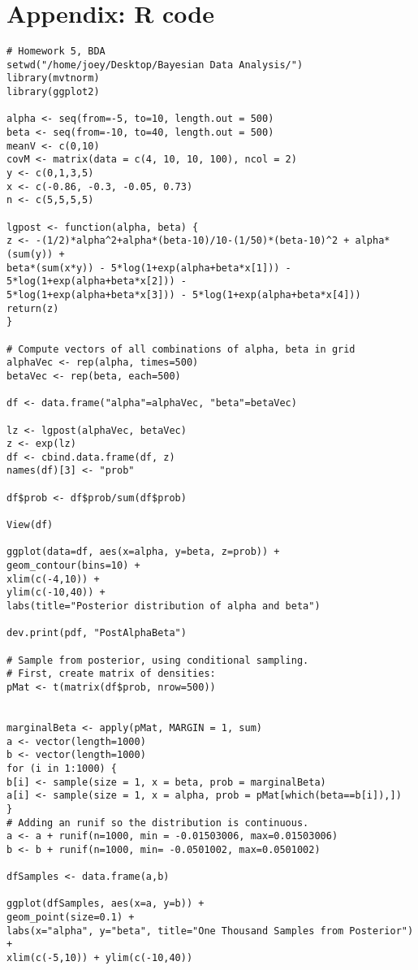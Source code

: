 \documentclass[12pt]{article}
\begin{document}
\section{Appendix: R code}
\begin{Verbatim}
# Homework 5, BDA
setwd("/home/joey/Desktop/Bayesian Data Analysis/")
library(mvtnorm)
library(ggplot2)

alpha <- seq(from=-5, to=10, length.out = 500)
beta <- seq(from=-10, to=40, length.out = 500)
meanV <- c(0,10)
covM <- matrix(data = c(4, 10, 10, 100), ncol = 2)
y <- c(0,1,3,5)
x <- c(-0.86, -0.3, -0.05, 0.73)
n <- c(5,5,5,5)

lgpost <- function(alpha, beta) {
z <- -(1/2)*alpha^2+alpha*(beta-10)/10-(1/50)*(beta-10)^2 + alpha*(sum(y)) + 
beta*(sum(x*y)) - 5*log(1+exp(alpha+beta*x[1])) - 5*log(1+exp(alpha+beta*x[2])) - 
5*log(1+exp(alpha+beta*x[3])) - 5*log(1+exp(alpha+beta*x[4]))
return(z)
}

# Compute vectors of all combinations of alpha, beta in grid
alphaVec <- rep(alpha, times=500)
betaVec <- rep(beta, each=500)

df <- data.frame("alpha"=alphaVec, "beta"=betaVec)

lz <- lgpost(alphaVec, betaVec)
z <- exp(lz)
df <- cbind.data.frame(df, z)
names(df)[3] <- "prob"

df$prob <- df$prob/sum(df$prob)

View(df)

ggplot(data=df, aes(x=alpha, y=beta, z=prob)) +
geom_contour(bins=10) +
xlim(c(-4,10)) + 
ylim(c(-10,40)) +
labs(title="Posterior distribution of alpha and beta")

dev.print(pdf, "PostAlphaBeta")

# Sample from posterior, using conditional sampling.
# First, create matrix of densities:
pMat <- t(matrix(df$prob, nrow=500))


marginalBeta <- apply(pMat, MARGIN = 1, sum)
a <- vector(length=1000)
b <- vector(length=1000)
for (i in 1:1000) {
b[i] <- sample(size = 1, x = beta, prob = marginalBeta)
a[i] <- sample(size = 1, x = alpha, prob = pMat[which(beta==b[i]),])
}
# Adding an runif so the distribution is continuous.
a <- a + runif(n=1000, min = -0.01503006, max=0.01503006)
b <- b + runif(n=1000, min= -0.0501002, max=0.0501002)

dfSamples <- data.frame(a,b)

ggplot(dfSamples, aes(x=a, y=b)) +
geom_point(size=0.1) +
labs(x="alpha", y="beta", title="One Thousand Samples from Posterior") +
xlim(c(-5,10)) + ylim(c(-10,40))


\end{Verbatim}
\end{document}
